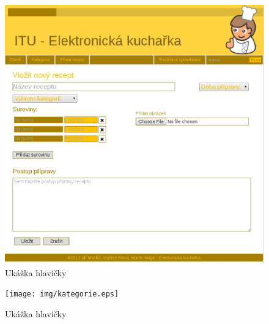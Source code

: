 \documentclass[12pt,a4paper,titlepage,final]{article}
\begin{document}
\begin{figure}

\begin{center}

\includegraphics[scale=0.7]{img/pridatrecept.eps} 
\caption{Ukážka hlavičky}
\label{koncept}

\end{center}

\end{figure}

\begin{figure}

\begin{center}

\texttt{[image: img/kategorie.eps]} 
\caption{Ukážka hlavičky}
\label{koncept}

\end{center}

\end{figure}
\end{document}

